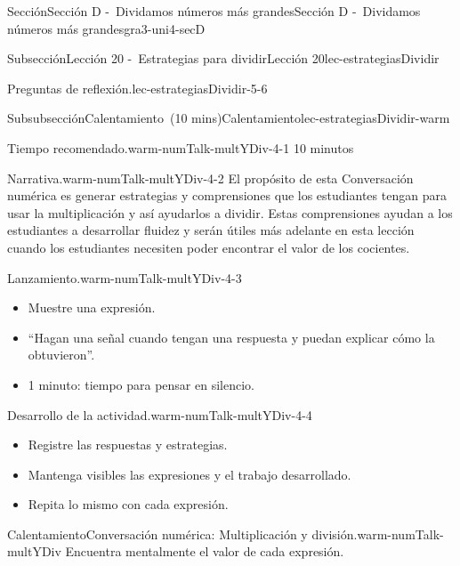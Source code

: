 \documentclass[oneside,10pt,]{article}
\begin{document}
\begin{sectionptx}{Sección}{Sección D -~Dividamos números más grandes}{}{Sección D -~Dividamos números más grandes}{}{}{gra3-uni4-secD}
\begin{subsectionptx}{Subsección}{Lección 20 -~Estrategias para dividir}{}{Lección 20}{}{}{lec-estrategiasDividir}
\begin{introduction}{}
\begin{paragraphs}{Preguntas de reflexión.}{lec-estrategiasDividir-5-6}
\end{paragraphs}%
\end{introduction}%
%
%
\typeout{************************************************}
\typeout{************************************************}
%
\begin{subsubsectionptx}{Subsubsección}{Calentamiento~(10 mins)}{}{Calentamiento}{}{}{lec-estrategiasDividir-warm}
\par
\begin{paragraphs}{Tiempo recomendado.}{warm-numTalk-multYDiv-4-1}%
10 minutos%
\end{paragraphs}%
\begin{paragraphs}{Narrativa.}{warm-numTalk-multYDiv-4-2}%
El propósito de esta Conversación numérica es generar estrategias y comprensiones que los estudiantes tengan para usar la multiplicación y así ayudarlos a dividir. Estas comprensiones ayudan a los estudiantes a desarrollar fluidez y serán útiles más adelante en esta lección cuando los estudiantes necesiten poder encontrar el valor de los cocientes.%
\end{paragraphs}%
\begin{paragraphs}{Lanzamiento.}{warm-numTalk-multYDiv-4-3}%
%
\begin{itemize}[label=\textbullet]
\item{}Muestre una expresión.%
\item{}``Hagan una señal cuando tengan una respuesta y puedan explicar cómo la obtuvieron''.%
\item{}1 minuto: tiempo para pensar en silencio.%
\end{itemize}
\end{paragraphs}%
\begin{paragraphs}{Desarrollo de la actividad.}{warm-numTalk-multYDiv-4-4}%
%
\begin{itemize}[label=\textbullet]
\item{}Registre las respuestas y estrategias.%
\item{}Mantenga visibles las expresiones y el trabajo desarrollado.%
\item{}Repita lo mismo con cada expresión.%
\end{itemize}
\end{paragraphs}%
\begin{exploration}{Calentamiento}{Conversación numérica: Multiplicación y división.}{warm-numTalk-multYDiv}%
Encuentra mentalmente el valor de cada expresión.%
%
\begin{enumerate}[label={\Alph*.}]

\end{enumerate}
\end{exploration}
\end{subsubsectionptx}
\end{subsectionptx}
\end{sectionptx}
\end{document}
